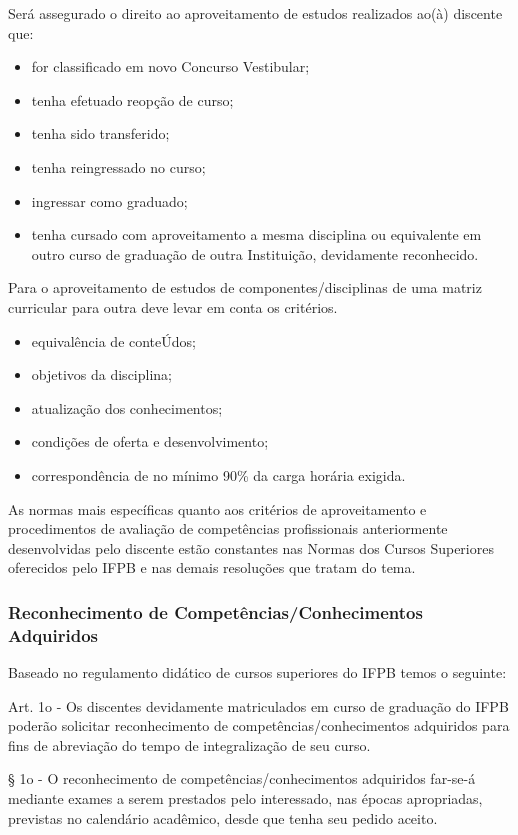 Será assegurado o direito ao aproveitamento de estudos realizados ao(à) discente que:
	\begin{itemize}
		\item for classificado em novo Concurso Vestibular;
		\item tenha efetuado reopção de curso;
		\item tenha sido transferido;
		\item tenha reingressado no curso;
		\item ingressar como graduado;
		\item tenha cursado com aproveitamento a mesma disciplina ou equivalente em outro curso de graduação de outra Instituição, devidamente reconhecido.
		\end{itemize}
		
		Para o aproveitamento de estudos de componentes/disciplinas de uma matriz curricular para outra deve levar em conta os critérios.
	\begin{itemize}
		\item equivalência de conteÚdos;
		\item objetivos da disciplina;
		\item atualização dos conhecimentos;
		\item condições de oferta e desenvolvimento;
		\item correspondência de no mínimo 90\% da carga horária exigida.
	\end{itemize}

	As normas mais específicas quanto aos critérios de aproveitamento e procedimentos de avaliação de competências profissionais anteriormente desenvolvidas pelo discente estão constantes nas Normas dos Cursos Superiores oferecidos pelo IFPB e nas demais resoluções que tratam do tema.
	
\subsubsection{Reconhecimento de Competências/Conhecimentos Adquiridos}

Baseado no regulamento didático de cursos superiores do IFPB temos o seguinte:

	Art. 1o - Os discentes devidamente matriculados em curso de graduação do IFPB poderão solicitar reconhecimento de competências/conhecimentos adquiridos para fins de abreviação do tempo de integralização de seu curso.
	
	§ 1o - O reconhecimento de competências/conhecimentos adquiridos far-se-á mediante exames a serem prestados pelo interessado, nas épocas apropriadas, previstas no calendário acadêmico, desde que tenha seu pedido aceito.
	
